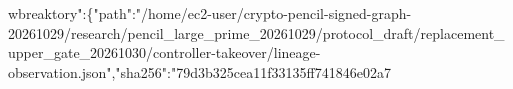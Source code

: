 \documentclass[10pt]{article}
\begin{document}
wbreak{}t\allowbreak{}o\allowbreak{}r\allowbreak{}y\allowbreak{}"\allowbreak{}:\allowbreak{}\{\allowbreak{}"\allowbreak{}p\allowbreak{}a\allowbreak{}t\allowbreak{}h\allowbreak{}"\allowbreak{}:\allowbreak{}"\allowbreak{}/\allowbreak{}h\allowbreak{}o\allowbreak{}m\allowbreak{}e\allowbreak{}/\allowbreak{}e\allowbreak{}c\allowbreak{}2\allowbreak{}-\allowbreak{}u\allowbreak{}s\allowbreak{}e\allowbreak{}r\allowbreak{}/\allowbreak{}c\allowbreak{}r\allowbreak{}y\allowbreak{}p\allowbreak{}t\allowbreak{}o\allowbreak{}-\allowbreak{}p\allowbreak{}e\allowbreak{}n\allowbreak{}c\allowbreak{}i\allowbreak{}l\allowbreak{}-\allowbreak{}s\allowbreak{}i\allowbreak{}g\allowbreak{}n\allowbreak{}e\allowbreak{}d\allowbreak{}-\allowbreak{}g\allowbreak{}r\allowbreak{}a\allowbreak{}p\allowbreak{}h\allowbreak{}-\allowbreak{}2\allowbreak{}0\allowbreak{}2\allowbreak{}6\allowbreak{}1\allowbreak{}0\allowbreak{}2\allowbreak{}9\allowbreak{}/\allowbreak{}r\allowbreak{}e\allowbreak{}s\allowbreak{}e\allowbreak{}a\allowbreak{}r\allowbreak{}c\allowbreak{}h\allowbreak{}/\allowbreak{}p\allowbreak{}e\allowbreak{}n\allowbreak{}c\allowbreak{}i\allowbreak{}l\allowbreak{}\_\allowbreak{}l\allowbreak{}a\allowbreak{}r\allowbreak{}g\allowbreak{}e\allowbreak{}\_\allowbreak{}p\allowbreak{}r\allowbreak{}i\allowbreak{}m\allowbreak{}e\allowbreak{}\_\allowbreak{}2\allowbreak{}0\allowbreak{}2\allowbreak{}6\allowbreak{}1\allowbreak{}0\allowbreak{}2\allowbreak{}9\allowbreak{}/\allowbreak{}p\allowbreak{}r\allowbreak{}o\allowbreak{}t\allowbreak{}o\allowbreak{}c\allowbreak{}o\allowbreak{}l\allowbreak{}\_\allowbreak{}d\allowbreak{}r\allowbreak{}a\allowbreak{}f\allowbreak{}t\allowbreak{}/\allowbreak{}r\allowbreak{}e\allowbreak{}p\allowbreak{}l\allowbreak{}a\allowbreak{}c\allowbreak{}e\allowbreak{}m\allowbreak{}e\allowbreak{}n\allowbreak{}t\allowbreak{}\_\allowbreak{}u\allowbreak{}p\allowbreak{}p\allowbreak{}e\allowbreak{}r\allowbreak{}\_\allowbreak{}g\allowbreak{}a\allowbreak{}t\allowbreak{}e\allowbreak{}\_\allowbreak{}2\allowbreak{}0\allowbreak{}2\allowbreak{}6\allowbreak{}1\allowbreak{}0\allowbreak{}3\allowbreak{}0\allowbreak{}/\allowbreak{}c\allowbreak{}o\allowbreak{}n\allowbreak{}t\allowbreak{}r\allowbreak{}o\allowbreak{}l\allowbreak{}l\allowbreak{}e\allowbreak{}r\allowbreak{}-\allowbreak{}t\allowbreak{}a\allowbreak{}k\allowbreak{}e\allowbreak{}o\allowbreak{}v\allowbreak{}e\allowbreak{}r\allowbreak{}/\allowbreak{}l\allowbreak{}i\allowbreak{}n\allowbreak{}e\allowbreak{}a\allowbreak{}g\allowbreak{}e\allowbreak{}-\allowbreak{}o\allowbreak{}b\allowbreak{}s\allowbreak{}e\allowbreak{}r\allowbreak{}v\allowbreak{}a\allowbreak{}t\allowbreak{}i\allowbreak{}o\allowbreak{}n\allowbreak{}.\allowbreak{}j\allowbreak{}s\allowbreak{}o\allowbreak{}n\allowbreak{}"\allowbreak{},\allowbreak{}"\allowbreak{}s\allowbreak{}h\allowbreak{}a\allowbreak{}2\allowbreak{}5\allowbreak{}6\allowbreak{}"\allowbreak{}:\allowbreak{}"\allowbreak{}7\allowbreak{}9\allowbreak{}d\allowbreak{}3\allowbreak{}b\allowbreak{}3\allowbreak{}2\allowbreak{}5\allowbreak{}c\allowbreak{}e\allowbreak{}a\allowbreak{}1\allowbreak{}1\allowbreak{}f\allowbreak{}3\allowbreak{}3\allowbreak{}1\allowbreak{}3\allowbreak{}5\allowbreak{}f\allowbreak{}f\allowbreak{}7\allowbreak{}4\allowbreak{}1\allowbreak{}8\allowbreak{}4\allowbreak{}6\allowbreak{}e\allowbreak{}0\allowbreak{}2\allowbreak{}a\allowbreak{}7\
\end{document}
